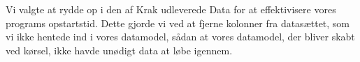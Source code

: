 Vi valgte at rydde op i den af Krak udleverede Data for at effektivisere vores programs opstartstid. Dette gjorde vi ved at fjerne  kolonner fra datasættet, som vi ikke hentede ind i vores datamodel, sådan at vores datamodel, der bliver skabt ved kørsel, ikke havde unødigt data at løbe igennem.